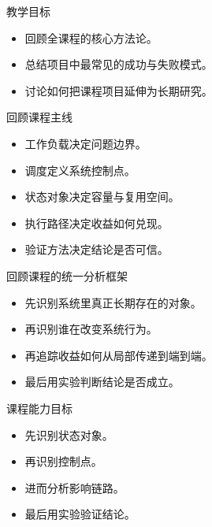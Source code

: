 




\begin{frame}[plain]
  \titlepage
\end{frame}

\begin{frame}{教学目标}
  \begin{itemize}
    \item 回顾全课程的核心方法论。
    \item 总结项目中最常见的成功与失败模式。
    \item 讨论如何把课程项目延伸为长期研究。
  \end{itemize}
\end{frame}

\begin{frame}{回顾课程主线}
  \begin{itemize}
    \item 工作负载决定问题边界。
    \item 调度定义系统控制点。
    \item 状态对象决定容量与复用空间。
    \item 执行路径决定收益如何兑现。
    \item 验证方法决定结论是否可信。
  \end{itemize}
\end{frame}

\begin{frame}{回顾课程的统一分析框架}
  \begin{itemize}
    \item 先识别系统里真正长期存在的对象。
    \item 再识别谁在改变系统行为。
    \item 再追踪收益如何从局部传递到端到端。
    \item 最后用实验判断结论是否成立。
  \end{itemize}
\end{frame}

\begin{frame}{课程能力目标}
  \begin{itemize}
    \item 先识别状态对象。
    \item 再识别控制点。
    \item 进而分析影响链路。
    \item 最后用实验验证结论。
  \end{itemize}
\end{frame}

